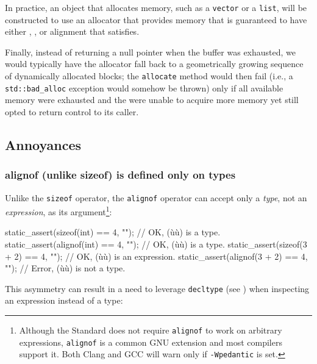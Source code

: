 \noindent In practice, an object that allocates memory, such as a \lstinline!vector!
or a \lstinline!list!, will be constructed to use an allocator that provides memory that is guaranteed to have either , , or alignment that satisfies.

Finally, instead of returning a null pointer when the buffer was
exhausted, we would typically have the allocator fall back to a
geometrically growing sequence of dynamically allocated blocks; the
\lstinline!allocate! method would then fail (i.e., a
\lstinline!std::bad_alloc! exception would somehow be thrown) only if all
available memory were exhausted and the 
were unable to acquire more memory yet still opted to return control
to its caller.

\subsection[Annoyances]{Annoyances}\label{annoyances-alignof}

\subsubsection[\lstinline!alignof! (unlike \lstinline!sizeof!) is defined only on types]{{\SubsubsecCode alignof} (unlike {\SubsubsecCode sizeof}) is defined only on types}\label{alignof-(unlike-sizeof)-is-defined-only-on-types}

Unlike the \lstinline!sizeof! operator, the \lstinline!alignof! operator can accept only a \emph{type}, not an \emph{expression}, as its argument{\cprotect\footnote{Although
the Standard does not require \lstinline!alignof! to work on arbitrary
expressions, \lstinline!alignof! is a common GNU extension and most compilers support
  it. Both Clang and GCC will warn only if \lstinline!-Wpedantic! is set.}}:

\begin{emcppslisting}
static_assert(sizeof(int)  == 4, "");     // OK, (ù{}ù) is a type.
static_assert(alignof(int) == 4, "");     // OK, (ù{}ù) is a type.
static_assert(sizeof(3 + 2) == 4, "");    // OK, (ù{}ù) is an expression.           
static_assert(alignof(3 + 2) == 4, "");   // Error, (ù{}ù) is not a type.
\end{emcppslisting}
    
\noindent This asymmetry can result in a need to leverage
\lstinline!decltype! (see ) when inspecting an expression instead
of a type:

